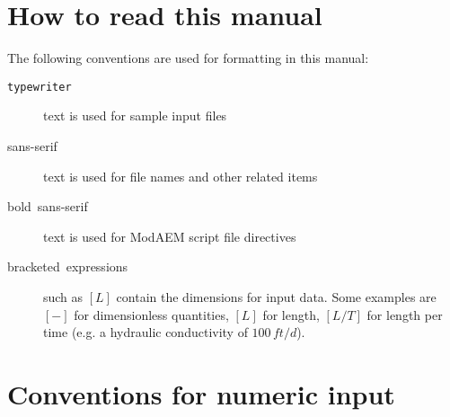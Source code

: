 \section{How to read this manual}

The following conventions are used for formatting in this manual:
\begin{description}
\item [{\texttt{\textmd{typewriter}}}] text is used for sample input files
\item [{\textsf{\textmd{sans-serif}}}] text is used for file names and
other related items
\item [{\textsf{bold~sans-seri}f}] text is used for ModAEM script file
directives
\item [{bracketed~expressions}] such as $[L]$ contain the dimensions
for input data. Some examples are $[-]$ for dimensionless quantities,
$[L]$ for length, $[L/T]$ for length per time (e.g. a hydraulic
conductivity of $100\, ft/d$).
\end{description}

\section{Conventions for numeric input\label{sec:numeric-values}}

